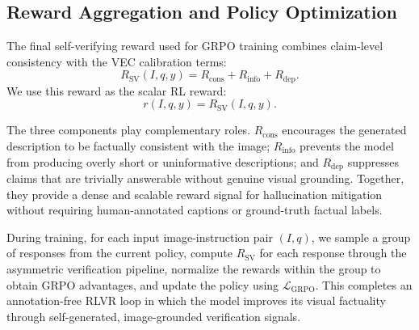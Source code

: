 \subsection{Reward Aggregation and Policy Optimization}
\label{sec:reward_aggregation}

The final self-verifying reward used for GRPO training combines claim-level
consistency with the VEC calibration terms:
\begin{equation}
    R_{\mathrm{SV}}(I,q,y)
    =
    R_{\mathrm{cons}}
    +
    R_{\mathrm{info}}
    +
    R_{\mathrm{dep}}.
\end{equation}
We use this reward as the scalar RL reward:
\begin{equation}
    r(I,q,y)
    =
    R_{\mathrm{SV}}(I,q,y).
\end{equation}

The three components play complementary roles. $R_{\mathrm{cons}}$ encourages
the generated description to be factually consistent with the image;
$R_{\mathrm{info}}$ prevents the model from producing overly short or
uninformative descriptions; and $R_{\mathrm{dep}}$ suppresses claims that are
trivially answerable without genuine visual grounding. Together, they provide a
dense and scalable reward signal for hallucination mitigation without requiring
human-annotated captions or ground-truth factual labels.

During training, for each input image-instruction pair $(I,q)$, we sample a group
of responses from the current policy, compute $R_{\mathrm{SV}}$ for each
response through the asymmetric verification pipeline, normalize the rewards
within the group to obtain GRPO advantages, and update the policy using
$\mathcal{L}_{\mathrm{GRPO}}$. This completes an annotation-free RLVR loop in
which the model improves its visual factuality through self-generated,
image-grounded verification signals.
